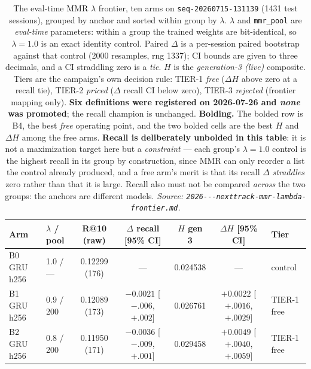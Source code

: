 \documentclass[11pt]{article}
\newcommand{\dsid}[1]{\texttt{\small #1}}
\begin{document}
\begin{table}[ht]
  \centering
  \caption{The eval-time MMR $\lambda$ frontier, ten arms on
    \dsid{seq-20260715-131139} (\num{1431} test sessions), grouped by anchor and
    sorted within group by $\lambda$. $\lambda$ and \texttt{mmr\_pool} are
    \emph{eval-time} parameters: within a group the trained weights are
    bit-identical, so $\lambda=\num{1.0}$ is an exact identity control. Paired
    $\Delta$ is a per-session paired bootstrap against that control (\num{2000}
    resamples, rng 1337); CI bounds are given to three decimals, and a CI
    straddling zero is a \emph{tie}. $H$ is the \emph{generation-3 (live)}
    composite. Tiers are the campaign's own decision rule: TIER-1 \emph{free}
    ($\Delta H$ above zero at a recall tie), TIER-2 \emph{priced} ($\Delta$
    recall CI below zero), TIER-3 \emph{rejected} (frontier mapping only).
    \textbf{Six definitions were registered on 2026-07-26 and \emph{none} was
    promoted}; the recall champion is unchanged. \textbf{Bolding.} The bolded row
    is B4, the best \emph{free} operating point, and the two bolded cells are the
    best $H$ and $\Delta H$ among the free arms. \textbf{Recall is deliberately
    unbolded in this table}: it is not a maximization target here but a
    \emph{constraint} --- each group's $\lambda=\num{1.0}$ control is the highest
    recall in its group by construction, since MMR can only reorder a list the
    control already produced, and a free arm's merit is that its recall $\Delta$
    \emph{straddles} zero rather than that it is large. Recall also must not be
    compared \emph{across} the two groups: the anchors are different models.
    \emph{Source:
    \texttt{2026---\allowbreak nexttrack-\allowbreak mmr-\allowbreak lambda-\allowbreak frontier.md}.}}
  \label{tab:mmr}
  {\scriptsize\setlength{\tabcolsep}{2.2pt}\begin{tabular}{llccccl}
    \toprule
    Arm & $\lambda$ / pool & R@10 (raw) & $\Delta$ recall [95\% CI] & $H$ gen 3 & $\Delta H$ [95\% CI] & Tier \\
    \midrule
    B0 GRU h256 & 1.0 / --- & 0.12299 (176) & --- & 0.024538 & --- & control \\
    B1 GRU h256 & 0.9 / 200 & 0.12089 (173) & $-0.0021$ [$-.006$, $+.002$] & 0.026761 & $+0.0022$ [$+.0016$, $+.0029$] & TIER-1 free \\
    B2 GRU h256 & 0.8 / 200 & 0.11950 (171) & $-0.0036$ [$-.009$, $+.001$] & 0.029458 & $+0.0049$ [$+.0040$, $+.0059$] & TIER-1 free \\

\end{tabular}}
\end{table}
\end{document}
